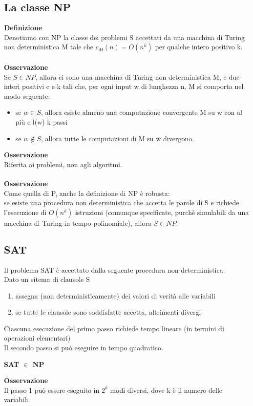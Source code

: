 \subsection{La classe NP}
\textbf{Definizione}\\
Denotiamo con NP la classe dei problemi S accettati da una macchina di Turing non deterministica M tale che $c_M(n) = O(n^k)$ per qualche intero positivo k.\\\\
\textbf{Osservazione}\\
Se $S \in NP$, allora ci sono una macchina di Turing non deterministica M, e due interi positivi c e k tali che, per ogni input w di lunghezza n, M si comporta nel modo seguente:
\begin{itemize}

    \item se $w \in S$, allora esiste almeno una computazione convergente M su w con al più c l(w) k passi
    
    \item se $w \notin S$, allora tutte le computazioni di M su w divergono.
\end{itemize}
\textbf{Osservazione}\\
Riferita ai problemi, non agli algoritmi.\\\\
\textbf{Osservazione}\\
Come quella di P, anche la definizione di NP è robusta:\\
se esiste una procedura non deterministica che accetta le parole di S e richiede l’esecuzione di $O(n^k)$ istruzioni (comunque specificate, purchè simulabili da una macchina di Turing in tempo polinomiale), allora $S \in NP$.
\subsection{SAT}
Il problema SAT è accettato dalla seguente procedura non-deterministica:\\
Dato un sitema di clausole S
\begin{enumerate}
    \item assegna (non deterministicamente) dei valori di verità alle variabili
    
    \item se tutte le clausole sono soddisfatte accetta, altrimenti divergi
\end{enumerate}
Ciascuna esecuzione del primo passo richiede tempo lineare (in termini di operazioni elementari)\\
Il secondo passo si può eseguire in tempo quadratico.
\begin{center}
    \textbf{SAT $\in$ NP}
\end{center}
\textbf{Osservazione}\\
Il passo 1 può essere eseguito in $2^k$ modi diversi, dove k è il numero delle variabili.
